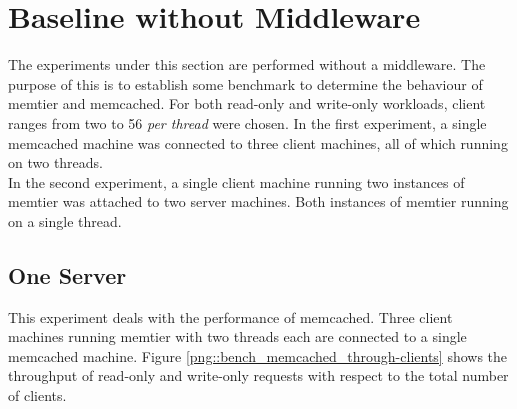 \documentclass[11pt,a4paper]{article}
\begin{document}
\newpage

\section{Baseline without Middleware}
The experiments under this section are performed without a middleware. The purpose of this is to establish some benchmark to determine the behaviour of memtier and memcached. For both read-only and write-only workloads, client ranges from two to 56 \textit{per thread} were chosen. In the first experiment, a single memcached machine was connected to three client machines, all of which running on two threads.\\
In the second experiment, a single client machine running two instances of memtier was attached to two server machines. Both instances of memtier running on a single thread.

\subsection{One Server}
This experiment deals with the performance of memcached. Three client machines running memtier with two threads each are connected to a single memcached machine. Figure \ref{png::bench_memcached_through-clients} shows the throughput of read-only and write-only requests with respect to the total number of clients.
\end{document}
